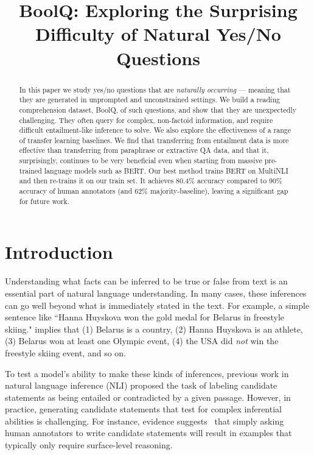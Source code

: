 \title{BoolQ: Exploring the Surprising Difficulty of Natural Yes/No Questions}

\begin{abstract}
In this paper we study yes/no questions that are {\em naturally occurring} --- meaning that they are generated in unprompted and unconstrained settings. We build a reading comprehension dataset, BoolQ, of such questions, and show that they are unexpectedly challenging. They often query for complex, non-factoid information, and require difficult entailment-like inference to solve. We also explore the effectiveness of a range of transfer learning baselines. We find that transferring from entailment data is more effective than transferring from paraphrase or extractive QA data, and that it, surprisingly, continues to be very beneficial even when starting from massive pre-trained language models such as BERT. Our best method trains BERT on MultiNLI and then re-trains it on our train set. It achieves 80.4\% accuracy compared to 90\% accuracy of human annotators (and 62\% majority-baseline), leaving a significant gap for future work.
\end{abstract}

\section{Introduction}
Understanding what facts can be inferred to be true or false from text is an essential part of natural language understanding. In many cases, these inferences can go well beyond what is immediately stated in the text. For example, a simple sentence like ``Hanna Huyskova won the gold medal for Belarus in freestyle skiing." implies that (1) Belarus is a country, (2) Hanna Huyskova is an athlete, (3) Belarus won at least one Olympic event, (4) the USA did \textit{not} win the freestyle skiing event, and so on.
\addtocounter{footnote}{1} 
\addtocounter{footnote}{1}

To test a model's ability to make these kinds of inferences, previous work in natural language inference (NLI) proposed the task of labeling candidate statements as being entailed or contradicted by a given passage. However, in practice, generating candidate statements that test for complex inferential abilities is challenging. For instance, evidence suggests~\cite{gururangan2018annotation, jia2017adversarial, mccoy2019right} that simply asking human annotators to write candidate statements will result in examples that typically only require surface-level reasoning.


